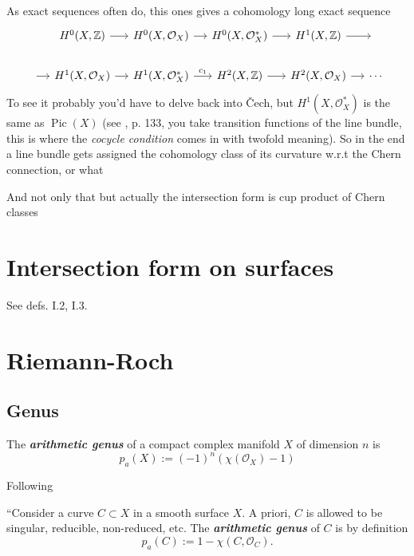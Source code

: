 As exact sequences often do, this ones gives a cohomology long exact sequence
\[\begin{tikzcd}[column sep=small]
	\leavevmode&H^{0}(X,\mathbb{Z})\arrow[r]&H^{0}(X,\mathcal{O}_X)\arrow[r]&H^{0}(X,\mathcal{O}_X^*)\arrow[r]&H^{1}(X,\mathbb{Z})\arrow[r]& \leavevmode\\
	\arrow[r]&H^{1}(X,\mathcal{O}_X)\arrow[r]&H^{1}(X,\mathcal{O}_X^*)\arrow[r,"c_1"]&H^{2}(X,\mathbb{Z})\arrow[r]&H^{2}(X,\mathcal{O}_X)\arrow[r]&\cdots
\end{tikzcd}\]
To see it probably you'd have to delve back into \v Cech, but \(H^{1}(X,\mathcal{O}_X^*)\) is the same as \(\operatorname{Pic}(X)\) (see \cite{gri}, p. 133, you take transition functions of the line bundle, this is where the \textit{cocycle condition} comes in with twofold meaning). So in the end a line bundle gets assigned the cohomology class of its curvature w.r.t the Chern connection, or what

And not only that but actually the intersection form is cup product of Chern classes

\section{Intersection form on surfaces}

See \cite{beu} defs. I.2, I.3.


\section{Riemann-Roch}

\subsection{Genus}

\begin{defn}\leavevmode
The \textit{\textbf{arithmetic genus}} of a compact complex manifold \(X\) of dimension \(n\) is
\[p_a(X):=(-1)^n (\chi(\mathcal{O}_X)-1)\]
\end{defn}

Following 
\begin{defn}\leavevmode
``Consider a curve \(C \subset X\) in a smooth surface \(X\). A priori, \(C\) is allowed to be singular, reducible, non-reduced, etc. The \textit{\textbf{arithmetic genus}} of \(C\) is by definition
\[p_a(C):= 1 - \chi(C, \mathcal{O}_C).\]
\end{defn}


